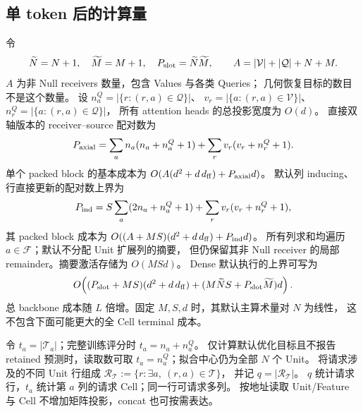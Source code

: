 \documentclass[11pt,UTF8,fontset=fandol]{ctexart}
\numberwithin{equation}{section}
\theoremstyle{definition}
\newcommand{\Fset}{\mathcal F}
\newcommand{\Vset}{\mathcal V}
\newcommand{\Qset}{\mathcal Q}
\newcommand{\TargetSet}{\mathcal T}
\begin{document}
\subsection{单 token 后的计算量}
令
\[
\widetilde N=N+1,\quad \widetilde M=M+1,\quad
P_{\rm slot}=\widetilde N\widetilde M,\qquad
A=|\Vset|+|\Qset|+N+M.
\]
$A$ 为非 Null receivers 数量，包含 Values 与各类 Queries；
几何恢复目标的数目不是这个数量。
设 $n_a^{Q}=|\{r:(r,a)\in\Qset\}|$、
$v_r=|\{a:(r,a)\in\Vset\}|$、
$n_r^{Q}=|\{a:(r,a)\in\Qset\}|$，
所有 attention heads 的总投影宽度为 $O(d)$。
直接双轴版本的 receiver--source 配对数为
\begin{equation}
P_{\rm axial}=\sum_a n_a(n_a+n_a^{Q}+1)
              +\sum_r v_r(v_r+n_r^{Q}+1).
\label{eq:cost:axial}
\end{equation}
单个 packed block 的基本成本为
$O(A(d^2+d\,d_{\rm ff})+P_{\rm axial}d)$。
默认列 inducing、行直接更新的配对数上界为
\begin{equation}
P_{\rm ind}=S\sum_a(2n_a+n_a^{Q}+1)
              +\sum_r v_r(v_r+n_r^{Q}+1),
\label{eq:cost:inducing}
\end{equation}
其 packed block 成本为
$O((A+MS)(d^2+d\,d_{\rm ff})+P_{\rm ind}d)$。
所有列求和均遍历 $a\in\Fset$；默认不分配 Unit 扩展列的摘要，
但仍保留其非 Null receiver 的局部 remainder。摘要激活存储为 $O(MSd)$。
Dense 默认执行的上界可写为
\begin{equation}
O\!\left((P_{\rm slot}+MS)(d^2+d\,d_{\rm ff})
          +(M\widetilde N S+P_{\rm slot}\widetilde M)d\right).
\end{equation}
总 backbone 成本随 $L$ 倍增。固定 $M,S,d$ 时，其默认主算术量对 $N$ 为线性，
这不包含下面可能更大的全 Cell terminal 成本。

令 $t_a=|\TargetSet_a|$；完整训练评分时 $t_a=n_a+n_a^{Q}$。
仅计算默认优化目标且不报告 retained 预测时，读取数可取 $t_a=n_a^Q$；拟合中心仍为全部 $N$ 个 Unit。
将请求涉及的不同 Unit 行组成
$\mathcal R_{\TargetSet}:=\{r:\exists a,\ (r,a)\in\TargetSet\}$，
并记 $q=|\mathcal R_{\TargetSet}|$。
$q$ 统计请求行，$t_a$ 统计第 $a$ 列的请求 Cell；同一行可请求多列。
按地址读取 Unit/Feature 与 Cell 不增加矩阵投影，concat 也可按需表达。
\end{document}

